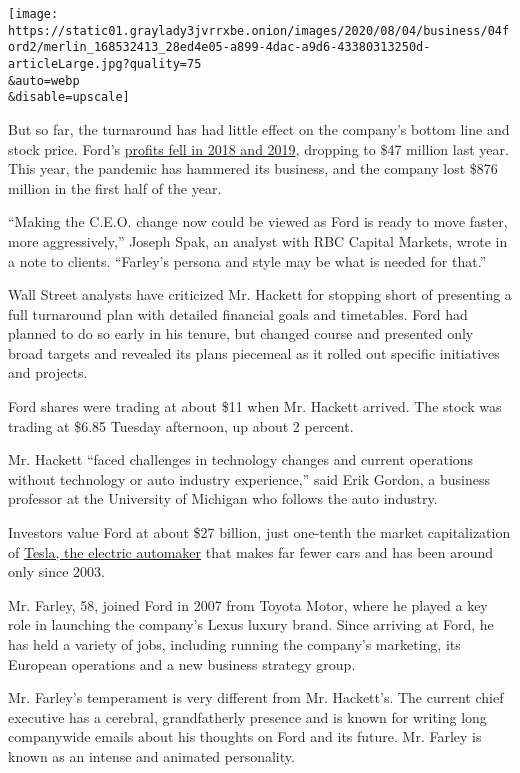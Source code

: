 \texttt{[image: https://static01.graylady3jvrrxbe.onion/images/2020/08/04/business/04ford2/merlin\_168532413\_28ed4e05-a899-4dac-a9d6-43380313250d-articleLarge.jpg?quality=75\\\&auto=webp\\\&disable=upscale]}

But so far, the turnaround has had little effect on the company's bottom
line and stock price. Ford's
\href{https://s23.q4cdn.com/799033206/files/doc_financials/quarterly/2019/q4/Ford-4Q2019-Earnings-Press-Release.pdf}{profits
fell in 2018 and 2019}, dropping to \$47 million last year. This year,
the pandemic has hammered its business, and the company lost \$876
million in the first half of the year.

``Making the C.E.O. change now could be viewed as Ford is ready to move
faster, more aggressively,'' Joseph Spak, an analyst with RBC Capital
Markets, wrote in a note to clients. ``Farley's persona and style may be
what is needed for that.''

Wall Street analysts have criticized Mr. Hackett for stopping short of
presenting a full turnaround plan with detailed financial goals and
timetables. Ford had planned to do so early in his tenure, but changed
course and presented only broad targets and revealed its plans piecemeal
as it rolled out specific initiatives and projects.

Ford shares were trading at about \$11 when Mr. Hackett arrived. The
stock was trading at \$6.85 Tuesday afternoon, up about 2 percent.

Mr. Hackett ``faced challenges in technology changes and current
operations without technology or auto industry experience,'' said Erik
Gordon, a business professor at the University of Michigan who follows
the auto industry.

Investors value Ford at about \$27 billion, just one-tenth the market
capitalization of
\href{https://www.nytimes3xbfgragh.onion/topic/company/tesla-motors-inc}{Tesla,
the electric automaker} that makes far fewer cars and has been around
only since 2003.

Mr. Farley, 58, joined Ford in 2007 from Toyota Motor, where he played a
key role in launching the company's Lexus luxury brand. Since arriving
at Ford, he has held a variety of jobs, including running the company's
marketing, its European operations and a new business strategy group.

Mr. Farley's temperament is very different from Mr. Hackett's. The
current chief executive has a cerebral, grandfatherly presence and is
known for writing long companywide emails about his thoughts on Ford and
its future. Mr. Farley is known as an intense and animated personality.

